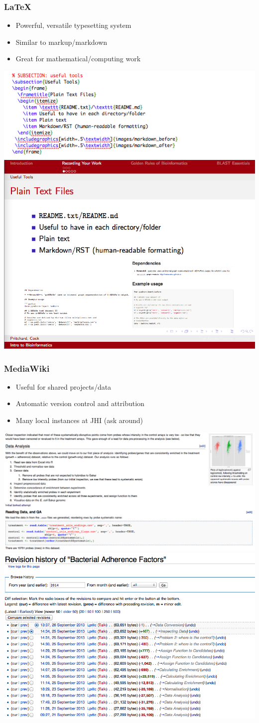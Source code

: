 \documentclass[table]{beamer}
\begin{document}
   \begin{frame}
     \frametitle{\LaTeX}
     \begin{itemize}
       \item Powerful, versatile typesetting system
       \item Similar to markup/markdown
       \item Great for mathematical/computing work
     \end{itemize}
    \includegraphics[width=.35\textwidth]{images/latex_before}
	\includegraphics[width=.35\textwidth]{images/latex_after}     
   \end{frame}
   
   \begin{frame}
     \frametitle{MediaWiki}
     \begin{itemize}
       \item Useful for shared projects/data
       \item Automatic version control and attribution
       \item Many local instances at JHI (ask around)
     \end{itemize}
    \includegraphics[width=.4\textwidth]{images/mediawiki_after}
	\includegraphics[width=.4\textwidth]{images/mediawiki_version_control}     
   \end{frame}
   
\end{document}
